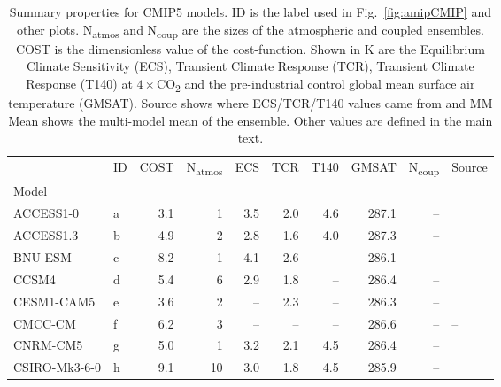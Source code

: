 \begin{table}
\centering
\caption{\small{Summary properties for CMIP5 models. 
 ID is the label used in Fig.~\ref{fig:amipCMIP} and other plots. N\textsubscript{atmos} and N\textsubscript{coup} are the sizes of the atmospheric and coupled ensembles.  
 COST is the dimensionless value of the cost-function.
  Shown in K are the Equilibrium Climate Sensitivity (ECS), Transient Climate Response (TCR), Transient Climate Response (T140) at $4\times$CO\textsubscript{2} and the 
  pre-industrial control global mean surface air temperature (GMSAT). 
   Source shows where ECS/TCR/T140 values came from and MM Mean shows the multi-model mean of the ensemble. Other values are defined in the main text.}}
\label{tab:cmip5}
\begin{tabular}{llrrrrrrrl}
\toprule
{} &  ID &  COST &  N\textsubscript{atmos} &  ECS &  TCR &  T140 &  GMSAT &  N\textsubscript{coup} &                   Source \\
Model         &     &       &                         &      &      &       &        &                        &                          \\
\midrule
ACCESS1-0     &   a &   3.1 &                       1 &  3.5 &  2.0 &   4.6 &  287.1 &                   -- &     \citet{gregory15tcr} \\
ACCESS1.3     &   b &   4.9 &                       2 &  2.8 &  1.6 &   4.0 &  287.3 &                   -- &     \citet{gregory15tcr} \\
BNU-ESM       &   c &   8.2 &                       1 &  4.1 &  2.6 &    -- &  286.1 &                   -- &  \citet{stocker2013ipcc} \\
CCSM4         &   d &   5.4 &                       6 &  2.9 &  1.8 &    -- &  286.4 &                   -- &  \citet{stocker2013ipcc} \\
CESM1-CAM5    &   e &   3.6 &                       2 &   -- &  2.3 &    -- &  286.3 &                   -- &  \citet{stocker2013ipcc} \\
CMCC-CM       &   f &   6.2 &                       3 &   -- &   -- &    -- &  286.6 &                   -- &                       -- \\
CNRM-CM5      &   g &   5.0 &                       1 &  3.2 &  2.1 &   4.5 &  286.4 &                   -- &     \citet{gregory15tcr} \\
CSIRO-Mk3-6-0 &   h &   9.1 &                      10 &  3.0 &  1.8 &   4.5 &  285.9 &                   -- &     \citet{gregory15tcr} \\

\end{tabular}
\end{table}
